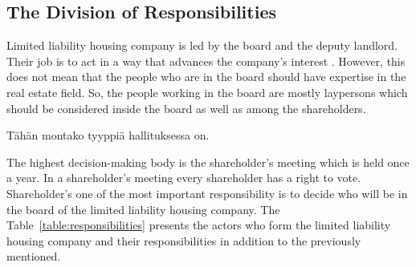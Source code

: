 \subsection{The Division of Responsibilities}

Limited liability housing company is led by the board and the deputy landlord. Their job is to act in a way that advances the company's interest \parencite{LLHA:2}. However, this does not mean that the people who are in the board should have expertise in the real estate field. So, the people working in the board are mostly laypersons which should be considered inside the board as well as among the shareholders. \parencite{Hallintotapa:2017}

Tähän montako tyyppiä hallituksessa on.

The highest decision-making body is the shareholder's meeting which is held once a year. In a shareholder's meeting every shareholder has a right to vote. Shareholder's one of the most important responsibility is to decide who will be in the board of the limited liability housing company. The Table~\ref{table:responsibilities} presents the actors who form the limited liability housing company and their responsibilities in addition to the previously mentioned. \parencite{RantanenViiala:2015} 

